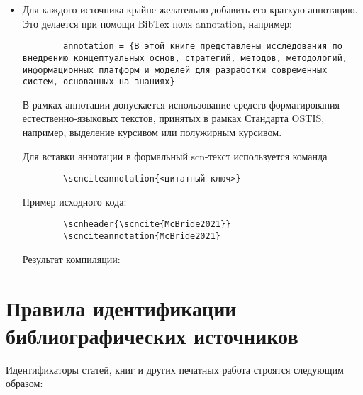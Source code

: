 \begin{itemize}
	\item Для каждого источника крайне желательно добавить его краткую аннотацию. Это делается при помощи BibTex поля annotation, например:
	
	\begin{verbatim}
		annotation = {В этой книге представлены исследования по внедрению концептуальных основ, стратегий, методов, методологий, информационных платформ и моделей для разработки современных систем, основанных на знаниях}
	\end{verbatim}
	
	В рамках аннотации допускается использование средств форматирования естественно-языковых текстов, принятых в рамках Стандарта OSTIS, например, выделение курсивом или полужирным курсивом.
	
	Для вставки аннотации в формальный scn-текст используется команда 
	
	\begin{verbatim}
		\scnciteannotation{<цитатный ключ>}
	\end{verbatim}
	
	Пример исходного кода:
	
	\begin{verbatim}
		\scnheader{\scncite{McBride2021}}
		\scnciteannotation{McBride2021}
	\end{verbatim}
	
	Результат компиляции:
	
	
\end{itemize}

\section*{Правила идентификации библиографических источников}

Идентификаторы статей, книг и других печатных работа строятся следующим образом:

